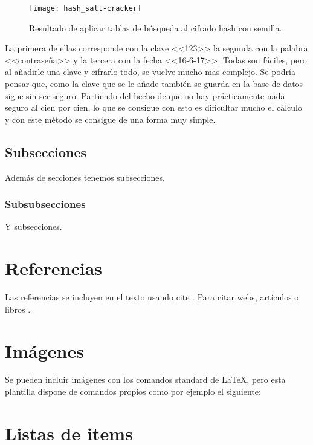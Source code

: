 \begin{figure}[h]
\centering
\texttt{[image: hash\_salt-cracker]}
\caption{Resultado de aplicar tablas de búsqueda al cifrado hash con semilla.}
\label{fig:3.3}
\end{figure}

La primera de ellas corresponde con la clave <<123>> la segunda con la palabra <<contraseña>> y la tercera con la fecha <<16-6-17>>. Todas son fáciles, pero al añadirle una clave y cifrarlo todo, se vuelve mucho mas complejo. Se podría pensar que, como la clave que se le añade también se guarda en la base de datos sigue sin ser seguro. Partiendo del hecho de que no hay prácticamente nada seguro al cien por cien, lo que se consigue con esto es dificultar mucho el cálculo y con este método se consigue de una forma muy simple.



\subsection{Subsecciones}

Además de secciones tenemos subsecciones.

\subsubsection{Subsubsecciones}

Y subsecciones. 


\section{Referencias}

Las referencias se incluyen en el texto usando cite \cite{wiki:latex}. Para citar webs, artículos o libros \cite{koza92}.


\section{Imágenes}

Se pueden incluir imágenes con los comandos standard de \LaTeX, pero esta plantilla dispone de comandos propios como por ejemplo el siguiente:




\section{Listas de items}

